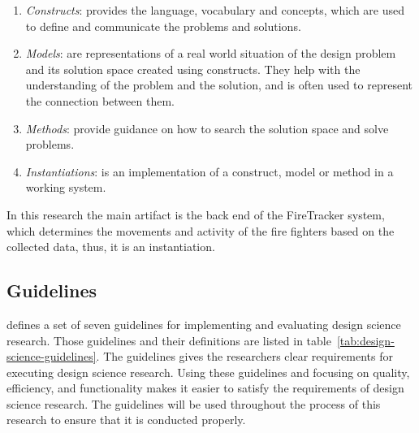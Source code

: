 \documentclass[../Main/thesis.tex]{subfiles}
\begin{document}
\begin{enumerate}
	\item \textit{Constructs}: provides the language, vocabulary and concepts, which are used to define and communicate the problems and solutions.
	\item \textit{Models}: are representations of a real world situation of the design problem and its solution space created using constructs. They help with the understanding of the problem and the solution, and is often used to represent the connection between them. 
	\item \textit{Methods}: provide guidance on how to search the solution space and solve problems.
	\item \textit{Instantiations}: is an implementation of a construct, model or method in a working system.
\end{enumerate}

In this research the main artifact is the back end of the FireTracker system, which determines the movements and activity of the fire fighters based on the collected data, thus, it is an instantiation.

\subsection{Guidelines}
\citet{hevner2004design} defines a set of seven guidelines for implementing and evaluating design science research.
Those guidelines and their definitions are listed in table~\ref{tab:design-science-guidelines}.
The guidelines gives the researchers clear requirements for executing design science research.
Using these guidelines and focusing on quality, efficiency, and functionality makes it easier to satisfy the requirements of design science research. 
The guidelines will be used throughout the process of this research to ensure that it is conducted properly.
\end{document}
